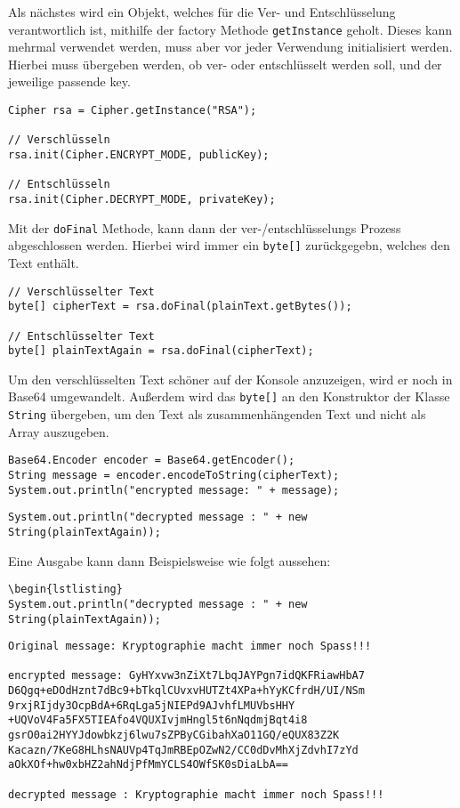 \documentclass[12pt]{article}
\begin{document}
Als nächstes wird ein Objekt, welches für die Ver- und Entschlüsselung verantwortlich ist, mithilfe der factory Methode \texttt{getInstance} geholt. Dieses kann mehrmal verwendet werden, muss aber vor jeder Verwendung initialisiert werden. Hierbei muss übergeben werden, ob ver- oder entschlüsselt werden soll, und der jeweilige passende key.

\begin{lstlisting}
Cipher rsa = Cipher.getInstance("RSA");

// Verschlüsseln
rsa.init(Cipher.ENCRYPT_MODE, publicKey);

// Entschlüsseln
rsa.init(Cipher.DECRYPT_MODE, privateKey);
\end{lstlisting}

Mit der \texttt{doFinal} Methode, kann dann der ver-/entschlüsselungs Prozess abgeschlossen werden. Hierbei wird immer ein \texttt{byte[]} zurückgegebn, welches den Text enthält.

\begin{lstlisting}
// Verschlüsselter Text
byte[] cipherText = rsa.doFinal(plainText.getBytes());

// Entschlüsselter Text
byte[] plainTextAgain = rsa.doFinal(cipherText);
\end{lstlisting}

Um den verschlüsselten Text schöner auf der Konsole anzuzeigen, wird er noch in Base64 umgewandelt. Außerdem wird das \texttt{byte[]} an den Konstruktor der Klasse \texttt{String} übergeben, um den Text als zusammenhängenden Text und nicht als Array auszugeben.

\begin{lstlisting}
Base64.Encoder encoder = Base64.getEncoder();
String message = encoder.encodeToString(cipherText);
System.out.println("encrypted message: " + message);
\end{lstlisting}

\begin{lstlisting}
System.out.println("decrypted message : " + new String(plainTextAgain));
\end{lstlisting}

Eine Ausgabe kann dann Beispielsweise wie folgt aussehen:
\begin{lstlisting}
\begin{lstlisting}
System.out.println("decrypted message : " + new String(plainTextAgain));
\end{lstlisting}

\begin{lstlisting}
Original message: Kryptographie macht immer noch Spass!!!

encrypted message: GyHYxvw3nZiXt7LbqJAYPgn7idQKFRiawHbA7
D6Qgq+eDOdHznt7dBc9+bTkqlCUvxvHUTZt4XPa+hYyKCfrdH/UI/NSm
9rxjRIjdy3OcpBdA+6RqLga5jNIEPd9AJvhfLMUVbsHHY
+UQVoV4Fa5FX5TIEAfo4VQUXIvjmHngl5t6nNqdmjBqt4i8
gsrO0ai2HYYJdowbkzj6lwu7sZPByCGibahXaO11GQ/eQUX83Z2K
Kacazn/7KeG8HLhsNAUVp4TqJmRBEpOZwN2/CC0dDvMhXjZdvhI7zYd
aOkXOf+hw0xbHZ2ahNdjPfMmYCLS4OWfSK0sDiaLbA==

decrypted message : Kryptographie macht immer noch Spass!!!
\end{lstlisting}
\end{document}
